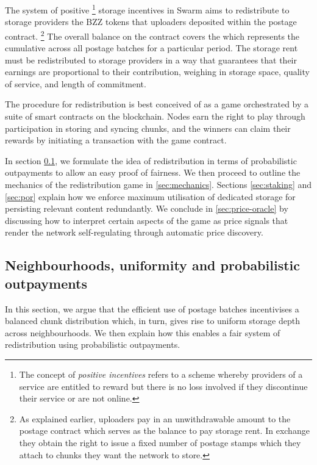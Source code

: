 The system of positive%
%
\footnote{The concept of \emph{positive incentives} refers to a scheme whereby providers of a service are entitled to reward but there is no loss involved if they discontinue their service or are not online.}
%
storage incentives in Swarm aims to redistribute to storage providers the BZZ tokens that uploaders deposited within the postage contract.%
%
\footnote{As explained earlier, uploaders pay in an unwithdrawable amount to the postage contract which serves as the balance to pay storage rent. In exchange they obtain the right to issue a fixed number of postage stamps which they attach to chunks they want the network to store.}
%
The overall balance on the contract covers the  which represents the cumulative  across all postage batches for a particular period. The storage rent must be redistributed to storage providers in a way that guarantees that their earnings are proportional to their contribution, weighing in storage space, quality of service, and length of commitment.

The procedure for redistribution is best conceived of as a game orchestrated by a suite of smart contracts on the blockchain. Nodes earn the right to play through participation in storing and syncing chunks, and the winners can claim their rewards by initiating a transaction with the game contract. 

In section \ref{sec:uniformity-pot}, we formulate the idea of redistribution in terms of probabilistic outpayments to allow an easy proof of fairness. We then proceed to outline the mechanics of the redistribution game in \ref{sec:mechanics}.
Sections \ref{sec:staking} and \ref{sec:por} explain how we enforce maximum utilisation of dedicated storage for persisting relevant content redundantly. We conclude in \ref{sec:price-oracle} by discussing how to interpret certain aspects of the game as price signals that render the network self-regulating through automatic price discovery. 

\subsection{Neighbourhoods, uniformity and probabilistic outpayments}\label{sec:uniformity-pot} 

In this section, we argue that the efficient use of postage batches incentivises a balanced chunk distribution which, in turn, gives rise to uniform storage depth across neighbourhoods. We then explain how this enables a fair system of redistribution using probabilistic outpayments.



